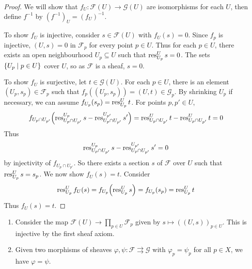 \begin{proof}
    We will show that \( f_U : \mathcal F(U) \to \mathcal G(U) \) are isomorphisms for each \( U \), then define \( f^{-1} \) by \( (f^{-1})_U = (f_U)^{-1} \).

    To show \( f_U \) is injective, consider \( s \in \mathcal F(U) \) with \( f_U(s) = 0 \).
    Since \( f_p \) is injective, \( (U, s) = 0 \) in \( \mathcal F_p \) for every point \( p \in U \).
    Thus for each \( p \in U \), there exists an open neighbourhood \( U_p \subseteq U \) such that \( \operatorname{res}^U_{U_p} s = 0 \).
    The sets \( \qty{U_p \mid p \in U} \) cover \( U \), so as \( \mathcal F \) is a sheaf, \( s = 0 \).

    To show \( f_U \) is surjective, let \( t \in \mathcal G(U) \).
    For each \( p \in U \), there is an element \( (U_p, s_p) \in \mathcal F_p \) such that \( f_p((U_p, s_p)) = (U, t) \in \mathcal G_p \).
    By shrinking \( U_p \) if necessary, we can assume \( f_{U_p}(s_p) = \operatorname{res}^U_{U_p} t \).
    For points \( p, p' \in U \),
    \[ f_{U_p \cap U_{p'}} \qty(\operatorname{res}^{U_p}_{U_p \cap U_{p'}} s - \operatorname{res}^{U_{p'}}_{U_p \cap U_{p'}} s') = \operatorname{res}^U_{U_p \cap U_{p'}} t - \operatorname{res}^U_{U_p \cap U_{p'}} t = 0 \]
    Thus
    \[ \operatorname{res}^{U_p}_{U_p \cap U_{p'}} s - \operatorname{res}^{U_{p'}}_{U_p \cap U_{p'}} s' = 0 \]
    by injectivity of \( f_{U_p \cap U_{p'}} \).
    So there exists a section \( s \) of \( \mathcal F \) over \( U \) such that \( \operatorname{res}^U_{U_p} s = s_p \).
    We now show \( f_U(s) = t \).
    Consider
    \[ \operatorname{res}^U_{U_p} f_U(s) = f_{U_p}\qty(\operatorname{res}^U_{U_p} s) = f_{U_p}(s_p) = \operatorname{res}^U_{U_p} t \]
    Thus \( f_U(s) = t \).
\end{proof}
\begin{remark}
    \begin{enumerate}
        \item Consider the map \( \mathcal F(U) \to \prod_{p \in U} \mathcal F_p \) given by \( s \mapsto ((U, s))_{p \in U} \).
        This is injective by the first sheaf axiom.
        \item Given two morphisms of sheaves \( \varphi, \psi : \mathcal F \rightrightarrows \mathcal G \) with \( \varphi_p = \psi_p \) for all \( p \in X \), we have \( \varphi = \psi \).
    \end{enumerate}
\end{remark}

